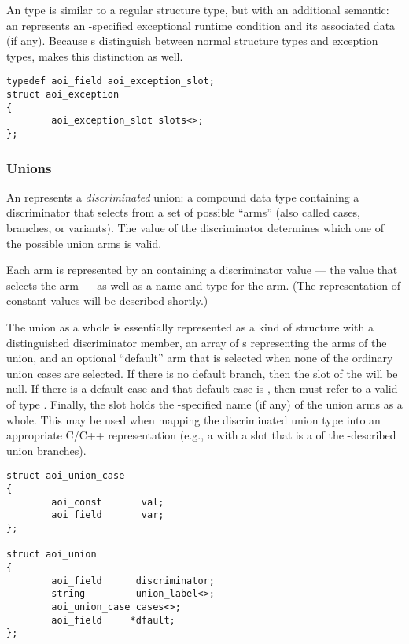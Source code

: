 An  type is similar to a regular structure type, but with an
additional semantic: an  represents an \IDL{}-specified
exceptional runtime condition and its associated data (if any).  Because
\IDL{}s distinguish between normal structure types and exception types, \AOI{}
makes this distinction as well.

\begin{verbatim}
typedef aoi_field aoi_exception_slot;
struct aoi_exception
{
        aoi_exception_slot slots<>;
};
\end{verbatim}


\subsubsection{Unions}

An  represents a \emph{discriminated} union: a compound data
type containing a discriminator that selects from a set of possible ``arms''
(also called cases, branches, or variants).  The value of the discriminator
determines which one of the possible union arms is valid.

Each arm is represented by an  containing a discriminator
value --- the value that selects the arm --- as well as a name and type for the
arm.  (The \AOI{} representation of constant values will be described shortly.)

The union as a whole is essentially represented as a kind of structure with a
distinguished discriminator member, an array of s
representing the arms of the union, and an optional ``default'' arm that is
selected when none of the ordinary union cases are selected.  If there is no
default branch, then the  slot of the  will be null.
If there is a default case and that default case is , then
 must refer to a valid  of type \@.
Finally, the  slot holds the \IDL{}-specified name (if any) of
the union arms as a whole.  This may be used when mapping the discriminated
union type into an appropriate C/C++ representation (e.g., a 
with a slot that is a  of the \AOI{}-described union branches).

\begin{verbatim}
struct aoi_union_case
{
        aoi_const       val;
        aoi_field       var;
};

struct aoi_union
{
        aoi_field      discriminator;
        string         union_label<>;
        aoi_union_case cases<>;
        aoi_field     *dfault;
};
\end{verbatim}

